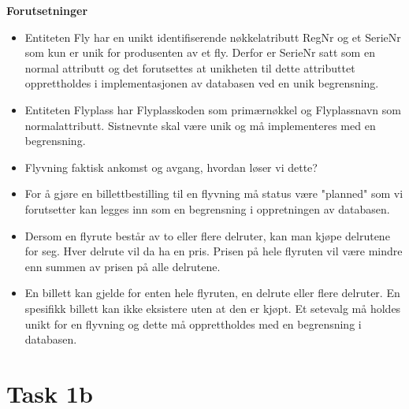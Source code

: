 \documentclass[a4paper,12pt]{article}
\begin{document}
\textbf{Forutsetninger}
\begin{itemize}
\item Entiteten Fly har en unikt identifiserende nøkkelatributt RegNr og et SerieNr som kun er unik for produsenten av et fly. Derfor er SerieNr satt som en normal attributt og det forutsettes at unikheten til dette attributtet opprettholdes i implementasjonen av databasen ved en unik begrensning.  
\item Entiteten Flyplass har Flyplasskoden som primærnøkkel og Flyplassnavn som normalattributt. Sistnevnte skal være unik og må implementeres med en begrensning.
\item Flyvning faktisk ankomst og avgang, hvordan løser vi dette?
\item For å gjøre en billettbestilling til en flyvning må status være "planned" som vi forutsetter kan legges inn som en begrensning i oppretningen av databasen. 
\item Dersom en flyrute består av to eller flere delruter, kan man kjøpe delrutene for seg. Hver delrute vil da ha en pris. Prisen på hele flyruten vil være
mindre enn summen av prisen på alle delrutene. 
\item En billett kan gjelde for enten hele flyruten, en delrute eller flere delruter. En spesifikk billett kan ikke eksistere uten at den er kjøpt. Et setevalg må holdes unikt for en flyvning og dette må opprettholdes med en begrensning i databasen.
\end{itemize}

\newpage{}

\section{Task 1b}
\end{document}
